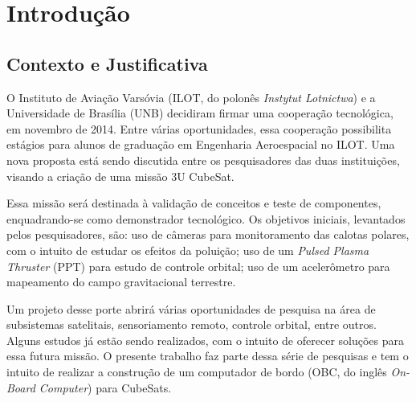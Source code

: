 



\chapter[Introdução]{Introdução}
\section{Contexto e Justificativa}

O Instituto de Aviação Varsóvia (ILOT, do polonês \textit{Instytut Lotnictwa}) e a Universidade de Brasília (UNB) decidiram firmar uma cooperação tecnológica, em novembro de 2014. Entre várias oportunidades, essa cooperação possibilita estágios para alunos de graduação em Engenharia Aeroespacial no ILOT. Uma nova proposta está sendo discutida entre os pesquisadores das duas instituições, visando a criação de uma missão 3U CubeSat.

Essa missão será destinada à validação de conceitos e teste de componentes, enquadrando-se como demonstrador tecnológico. Os objetivos iniciais, levantados pelos pesquisadores, são: uso de câmeras para monitoramento das calotas polares, com o intuito de estudar os efeitos da poluição; uso de um \textit{Pulsed Plasma Thruster} (PPT) para estudo de controle orbital;  uso de um acelerômetro para mapeamento do campo gravitacional terrestre.

Um projeto desse porte abrirá várias oportunidades de pesquisa na área de subsistemas satelitais, sensoriamento remoto, controle orbital, entre outros. Alguns estudos já estão sendo realizados, com o intuito de oferecer soluções para essa futura missão. O presente trabalho faz parte dessa série de pesquisas e tem o intuito de realizar a construção de um computador de bordo (OBC, do inglês \textit{On-Board Computer}) para CubeSats.

